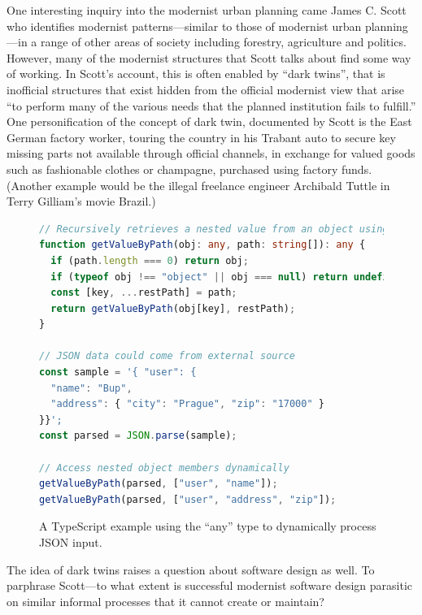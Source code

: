 One interesting inquiry into the modernist urban planning came James C. Scott who identifies
modernist patterns---similar to those of modernist urban planning---in a range of other
areas of society including forestry, agriculture and politics. However, many of the modernist
structures that Scott talks about find some way of working. In Scott's account, this is often
enabled by ``dark twins'', that is inofficial structures that exist hidden from the official
modernist view that arise ``to perform many of the various needs that the planned institution
fails to fulfill.'' One personification of the concept of dark twin,
documented by Scott is the East German factory worker, touring the country in his Trabant
auto to secure key missing parts not available through official channels, in exchange for
valued goods such as fashionable clothes or champagne, purchased using factory funds.
(Another example would be the illegal freelance engineer Archibald Tuttle in Terry Gilliam's
movie Brazil.)


\begin{figure}
\begin{lstlisting}[language=ts]
// Recursively retrieves a nested value from an object using a path
function getValueByPath(obj: any, path: string[]): any {
  if (path.length === 0) return obj;
  if (typeof obj !== "object" || obj === null) return undefined;
  const [key, ...restPath] = path;
  return getValueByPath(obj[key], restPath);
}

// JSON data could come from external source
const sample = '{ "user": {
  "name": "Bup",
  "address": { "city": "Prague", "zip": "17000" }
}}';
const parsed = JSON.parse(sample);

// Access nested object members dynamically
getValueByPath(parsed, ["user", "name"]);
getValueByPath(parsed, ["user", "address", "zip"]);
\end{lstlisting}
\caption{A TypeScript example using the ``any'' type to dynamically process JSON input.}
\label{fig:any}
\end{figure}

The idea of dark twins raises a question about software design as well. To parphrase Scott---to
what extent is successful modernist software design parasitic on similar informal processes that
it cannot create or maintain?

